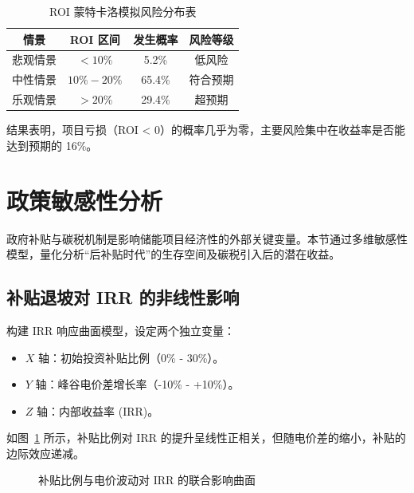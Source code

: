 \begin{table}[htbp]
    \centering
    \caption{ROI 蒙特卡洛模拟风险分布表}
    \label{tab:risk}
    \begin{tabular}{|c|c|c|c|}
        \hline
        \textbf{情景} & \textbf{ROI 区间} & \textbf{发生概率} & \textbf{风险等级} \\ \hline
        悲观情景        & $< 10\%$        & 5.2\%         & 低风险           \\ \hline
        中性情景        & $10\% - 20\%$   & 65.4\%        & 符合预期          \\ \hline
        乐观情景        & $> 20\%$        & 29.4\%        & 超预期           \\ \hline
    \end{tabular}
\end{table}

结果表明，项目亏损（ROI < 0）的概率几乎为零，主要风险集中在收益率是否能达到预期的 16\%。


\section{政策敏感性分析}

政府补贴与碳税机制是影响储能项目经济性的外部关键变量。本节通过多维敏感性模型，量化分析“后补贴时代”的生存空间及碳税引入后的潜在收益。

\subsection{补贴退坡对 IRR 的非线性影响}

构建 IRR 响应曲面模型，设定两个独立变量：
\begin{itemize}
    \item $X$ 轴：初始投资补贴比例（0\% - 30\%）。
    \item $Y$ 轴：峰谷电价差增长率（-10\% - +10\%）。
    \item $Z$ 轴：内部收益率 (IRR)。
\end{itemize}

如图~\ref{fig:subsidy_surf} 所示，补贴比例对 IRR 的提升呈线性正相关，但随电价差的缩小，补贴的边际效应递减。

\begin{figure}[H]
    \centering
    \caption{补贴比例与电价波动对 IRR 的联合影响曲面}
    \label{fig:subsidy_surf}
\end{figure}

